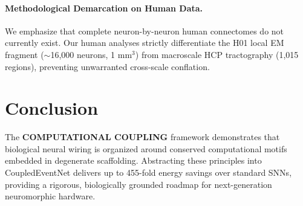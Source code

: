 \documentclass[10pt,twocolumn,letterpaper]{article}
\begin{document}
\paragraph{Methodological Demarcation on Human Data.}
We emphasize that complete neuron-by-neuron human connectomes do not currently exist. Our human analyses strictly differentiate the H01 local EM fragment ($\sim$16,000 neurons, 1 mm$^3$) from macroscale HCP tractography (1,015 regions), preventing unwarranted cross-scale conflation.

\section{Conclusion}

The \textbf{COMPUTATIONAL COUPLING} framework demonstrates that biological neural wiring is organized around conserved computational motifs embedded in degenerate scaffolding. Abstracting these principles into CoupledEventNet delivers up to 455-fold energy savings over standard SNNs, providing a rigorous, biologically grounded roadmap for next-generation neuromorphic hardware.



\end{document}

